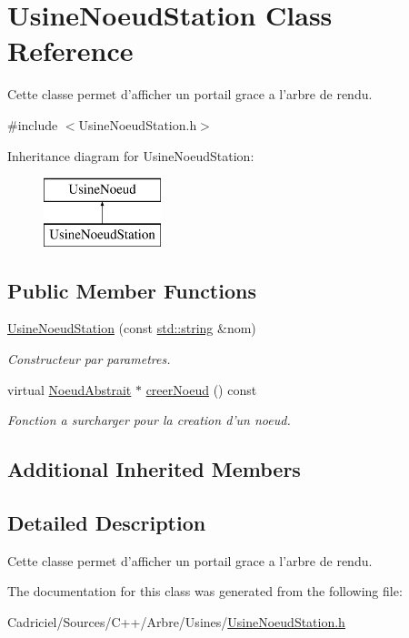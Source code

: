\hypertarget{class_usine_noeud_station}{\section{Usine\-Noeud\-Station Class Reference}
\label{class_usine_noeud_station}
}


Cette classe permet d'afficher un portail grace a l'arbre de rendu.  




{\ttfamily \#include $<$Usine\-Noeud\-Station.\-h$>$}

Inheritance diagram for Usine\-Noeud\-Station\-:\begin{figure}[H]
\begin{center}
\leavevmode
\includegraphics[height=2.000000cm]{class_usine_noeud_station}
\end{center}
\end{figure}
\subsection*{Public Member Functions}
\begin{DoxyCompactItemize}
\item 
\hyperlink{group__inf2990_ga2764ea906a40cc5c5c42748dd1a56d7c}{Usine\-Noeud\-Station} (const \hyperlink{glew_8h_ae84541b4f3d8e1ea24ec0f466a8c568b}{std\-::string} \&nom)
\begin{DoxyCompactList}\small\item\em Constructeur par parametres. \end{DoxyCompactList}\item 
virtual \hyperlink{class_noeud_abstrait}{Noeud\-Abstrait} $\ast$ \hyperlink{group__inf2990_gabc547440a5120276ecaf2a334186a602}{creer\-Noeud} () const 
\begin{DoxyCompactList}\small\item\em Fonction a surcharger pour la creation d'un noeud. \end{DoxyCompactList}\end{DoxyCompactItemize}
\subsection*{Additional Inherited Members}


\subsection{Detailed Description}
Cette classe permet d'afficher un portail grace a l'arbre de rendu. 

The documentation for this class was generated from the following file\-:\begin{DoxyCompactItemize}
\item 
Cadriciel/\-Sources/\-C++/\-Arbre/\-Usines/\hyperlink{_usine_noeud_station_8h}{Usine\-Noeud\-Station.\-h}\end{DoxyCompactItemize}
